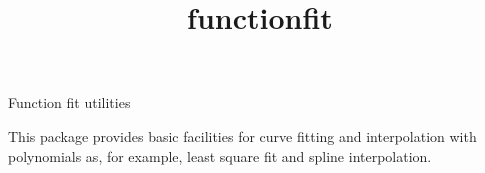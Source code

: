 \documentclass[12pt]{article}
\begin{document}
\begin{titlepage}
\title{functionfit}{Function fit utilities}

\vfill
This package provides basic facilities for curve fitting and interpolation
with polynomials as, for example, least square fit and spline interpolation.
\vfill
\end{titlepage}


\tableofcontents








\end{document}
